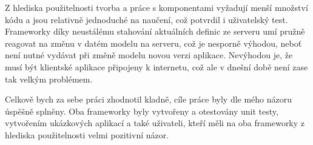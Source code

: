 Z hlediska použitelnosti tvorba a práce s komponentami vyžadují menší množství kódu a jsou relativně jednoduché na naučení, což potvrdil i uživatelský test. Frameworky díky neustálému stahování aktuálních definic ze serveru umí pružně reagovat na změnu v datém modelu na serveru, což je nesporně výhodou, neboť není nutné vydávat při změně modelu novou verzi aplikace. Nevýhodou je, že musí být klientské aplikace připojeny k internetu, což ale v dnešní době není zase tak velkým problémem. 

Celkově bych za sebe práci zhodnotil kladně, cíle práce byly dle mého názoru úspěšně splněny. Oba frameworky byly vytvořeny a otestovány unit testy, vytvořením ukázkových aplikací a také uživateli, kteří měli na oba frameworky z hlediska použitelnosti velmi pozitivní názor.